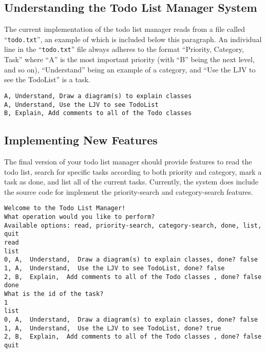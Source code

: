 \vspace{-0.1in}
\subsection*{Understanding the Todo List Manager System}
\vspace{-0.05in}

The current implementation of the todo list manager reads from a file called ``{\tt todo.txt}'', an example of which is
included below this paragraph. An individual line in the ``{\tt todo.txt}'' file always adheres to the format
``Priority, Category, Task'' where ``A'' is the most important priority (with ``B'' being the next level, and so on),
``Understand'' being an example of a category, and ``Use the LJV to see the TodoList'' is a task.

\vspace{-0.05in}
\begin{verbatim}
A, Understand, Draw a diagram(s) to explain classes
A, Understand, Use the LJV to see TodoList
B, Explain, Add comments to all of the Todo classes 
\end{verbatim}
\vspace{-0.05in}

\vspace{-0.1in}
\subsection*{Implementing New Features}
\vspace{-0.05in}

The final version of your todo list manager should provide features to read the todo list, search for specific tasks
according to both priority and category, mark a task as done, and list all of the current tasks.  Currently, the system
does include the source code for implement the priority-search and category-search features.

\vspace{-0.05in}
\begin{verbatim}
Welcome to the Todo List Manager!
What operation would you like to perform?
Available options: read, priority-search, category-search, done, list, quit
read
list
0, A,  Understand,  Draw a diagram(s) to explain classes, done? false
1, A,  Understand,  Use the LJV to see TodoList, done? false
2, B,  Explain,  Add comments to all of the Todo classes , done? false
done
What is the id of the task?
1
list
0, A,  Understand,  Draw a diagram(s) to explain classes, done? false
1, A,  Understand,  Use the LJV to see TodoList, done? true
2, B,  Explain,  Add comments to all of the Todo classes , done? false
quit
\end{verbatim}
\vspace{-0.05in}


